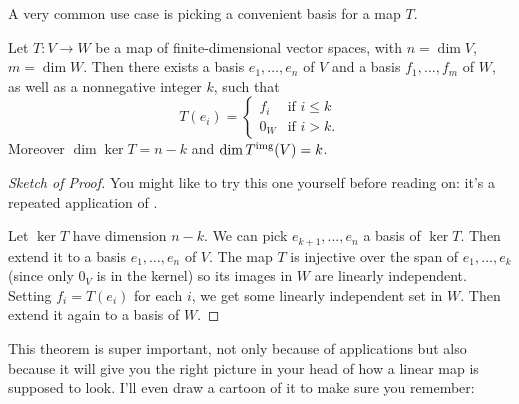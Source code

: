 A very common use case is picking a convenient basis for a map $T$.
\begin{theorem}
	\label{thm:linear_map_basis}
	Let $T \colon V \to W$ be a map of finite-dimensional vector spaces,
	with $n = \dim V$, $m = \dim W$.
	Then there exists a basis $e_1, \dots, e_n$ of $V$
	and a basis $f_1, \dots, f_m$ of $W$,
	as well as a nonnegative integer $k$, such that
	\[
		T(e_i) =
		\begin{cases}
			f_i & \text{if $i \le k$} \\
			0_W & \text{if $i > k$}.
		\end{cases}
	\]
	Moreover $\dim \ker T = n-k$ and $\dim T^{\text{img}}(V) = k$.
\end{theorem}
\begin{proof}[Sketch of Proof]
	You might like to try this one yourself before reading on:
	it's a repeated application of .

	Let $\ker T$ have dimension $n-k$.
	We can pick $e_{k+1}, \dots, e_{n}$ a basis of $\ker T$.
	Then extend it to a basis $e_1, \dots, e_n$ of $V$.
	The map $T$ is injective over the span of $e_1, \dots, e_k$
	(since only $0_V$ is in the kernel) so its images in $W$ are linearly independent.
	Setting $f_i = T(e_i)$ for each $i$,
	we get some linearly independent set in $W$.
	Then extend it again to a basis of $W$.
\end{proof}

This theorem is super important,
not only because of applications but also
because it will give you the right picture in your head
of how a linear map is supposed to look.
I'll even draw a cartoon of it to make sure you remember:

